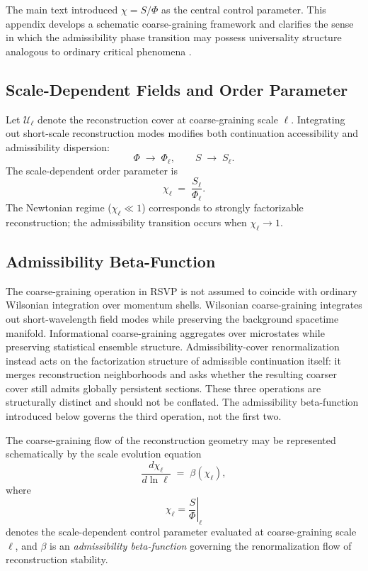 \documentclass[11pt, a4paper]{article}
\theoremstyle{plain}
\theoremstyle{definition}
\theoremstyle{remark}
\newcommand{\Ucover}{\mathcal{U}}
\begin{document}
The main text introduced $\chi = S/\Phi$ as the central control parameter. This
appendix develops a schematic coarse-graining framework and clarifies the sense in
which the admissibility phase transition may possess universality structure analogous
to ordinary critical phenomena \cite{wilson1974,goldenfeld1992}.

\subsection{Scale-Dependent Fields and Order Parameter}

Let $\Ucover_\ell$ denote the reconstruction cover at coarse-graining scale $\ell$.
Integrating out short-scale reconstruction modes modifies both continuation
accessibility and admissibility dispersion:
\[
  \Phi \;\longrightarrow\; \Phi_\ell, \qquad S \;\longrightarrow\; S_\ell.
\]
The scale-dependent order parameter is
\[
  \chi_\ell \;=\; \frac{S_\ell}{\Phi_\ell}.
\]
The Newtonian regime ($\chi_\ell \ll 1$) corresponds to strongly factorizable
reconstruction; the admissibility transition occurs when $\chi_\ell \to 1$.

\subsection{Admissibility Beta-Function}

The coarse-graining operation in RSVP is not assumed to coincide with ordinary
Wilsonian integration over momentum shells. Wilsonian coarse-graining integrates out
short-wavelength field modes while preserving the background spacetime manifold.
Informational coarse-graining aggregates over microstates while preserving statistical
ensemble structure. Admissibility-cover renormalization instead acts on the
factorization structure of admissible continuation itself: it merges reconstruction
neighborhoods and asks whether the resulting coarser cover still admits globally
persistent sections. These three operations are structurally distinct and should not
be conflated. The admissibility beta-function introduced below governs the third
operation, not the first two.

The coarse-graining flow of the reconstruction geometry may be represented
schematically by the scale evolution equation
\begin{equation}
  \label{eq:beta}
  \frac{d\chi_\ell}{d\ln \ell}
  \;=\;
  \beta(\chi_\ell),
\end{equation}
where
\[
  \chi_\ell
  =
  \left.\frac{S}{\Phi}\right|_{\ell}
\]
denotes the scale-dependent control parameter evaluated at coarse-graining scale
$\ell$, and $\beta$ is an \emph{admissibility beta-function} governing the
renormalization flow of reconstruction stability.
\end{document}
